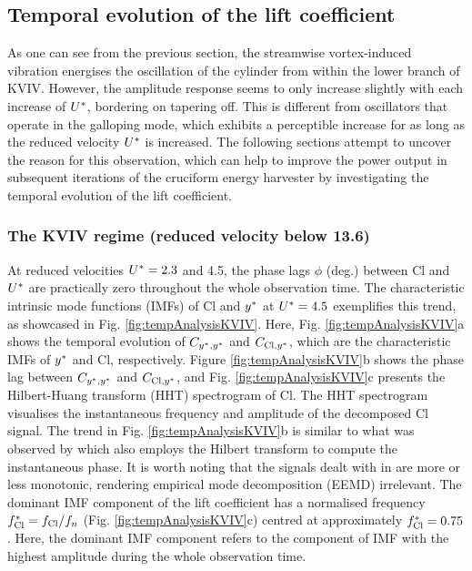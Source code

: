 \documentclass[oneside]{utmthesis}
\begin{document}
\subsection{Temporal evolution of the lift coefficient} \label{ssec:tempEvo}
As one can see from the previous section, the streamwise vortex-induced vibration energises the oscillation of the cylinder from within the lower branch of KVIV. However, the amplitude response seems to only increase slightly with each increase of $U^{*}$, bordering on tapering off. This is different from oscillators that operate in the galloping mode, which exhibits a perceptible increase for as long as the reduced velocity $U^{*}$ is increased. The following sections attempt to uncover the reason for this observation, which can help to improve the power output in subsequent iterations of the cruciform energy harvester by investigating the temporal evolution of the lift coefficient.

\subsubsection{The KVIV regime (reduced velocity below 13.6)} \label{sssec:phaseLag}
At reduced velocities  $U^{*} = 2.3$ and 4.5, the phase lags  $\phi$ (deg.) between Cl and  $U^{*}$ are practically zero throughout the whole observation time. The characteristic intrinsic mode functions (IMFs) of Cl and  $y^{*}$ at $U^{*} = 4.5$ exemplifies this trend, as showcased in Fig. \ref{fig:tempAnalysisKVIV}. Here, Fig. \ref{fig:tempAnalysisKVIV}a shows the temporal evolution of $C_{y^{*},y^{*}}$ and $C_{\text{Cl},y^{*}}$, which are the characteristic IMFs of $y^{*}$ and Cl, respectively. Figure \ref{fig:tempAnalysisKVIV}b shows the phase lag between $C_{y^{*},y^{*}}$ and $C_{\text{Cl},y^{*}}$, and Fig. \ref{fig:tempAnalysisKVIV}c presents the Hilbert-Huang transform (HHT) spectrogram of Cl. The HHT spectrogram visualises the instantaneous frequency and amplitude of the decomposed Cl signal. The trend in Fig. \ref{fig:tempAnalysisKVIV}b is similar to what was observed by \citet{Khalak1999} which also employs the Hilbert transform to compute the instantaneous phase. It is worth noting that the signals dealt with in \citet{Khalak1999} are more or less monotonic, rendering empirical mode decomposition (EEMD) irrelevant. The dominant IMF component of the lift coefficient has a normalised frequency $f_{\text{Cl}}^{*} = f_{\text{Cl}}/f_{n}$ (Fig. \ref{fig:tempAnalysisKVIV}c) centred at approximately $f_{\text{Cl}}^{*} = 0.75$. Here, the dominant IMF component refers to the component of IMF with the highest amplitude during the whole observation time.
\end{document}

